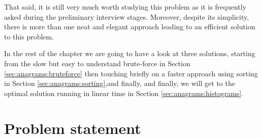 That said, it is still very much worth studying this problem as it is frequently asked during the preliminary interview stages. Moreover, despite its simplicity, there is more than one neat and elegant approach leading to an efficient
solution to this problem.

In the rest of the chapter we are going to have a look at three
solutions, starting from the slow but easy to understand brute-force in Section \ref{sec:anagrams:bruteforce} then touching briefly on a faster approach using sorting in Section \ref{sec:anagrams:sorting},and finally, and finally, we will get to the optimal solution running in linear time in Section
\ref{sec:anagrams:histograms}. 

\section{Problem statement}
